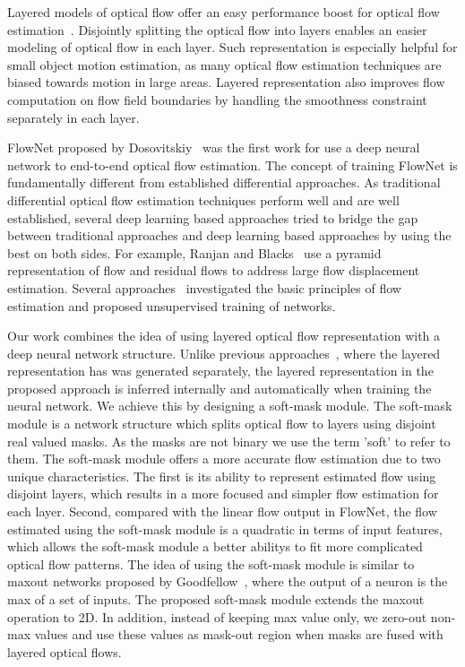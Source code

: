 \documentclass[10pt,twocolumn,letterpaper]{article}
\begin{document}
Layered models of optical flow offer an easy performance boost for optical flow estimation~\cite{wang1994representing}\cite{341161}\cite{darrell1995cooperative}. Disjointly splitting the optical flow into layers enables an easier modeling of optical flow in each layer. Such representation is especially helpful for small object motion estimation, as many optical flow estimation techniques are biased towards motion in large areas. Layered representation also improves flow computation on flow field boundaries by handling the smoothness constraint separately in each layer.

FlowNet proposed by Dosovitskiy~\cite{7410673} was the first work for use a deep neural network to end-to-end optical flow estimation. The concept of training FlowNet is fundamentally different from established differential approaches. As traditional differential optical flow estimation techniques perform well and are well established, several deep learning based approaches tried to bridge the gap between traditional approaches and deep learning based approaches by using the best on both sides. For example, Ranjan and Blacks~\cite{Ranjan_2017_CVPR} use a pyramid representation of flow and residual flows to address large flow displacement estimation. Several approaches~\cite{ren2017unsupervised}\cite{ahmadi2016unsupervised}\cite{DBLP:journals/corr/YuHD16} investigated the basic principles of flow estimation and proposed unsupervised training of networks.   

Our work combines the idea of using layered optical flow representation with a deep neural network structure. Unlike previous approaches~\cite{yang2015dense}\cite{black1996estimating}\cite{ju1996skin}, where the layered representation has was generated separately, the layered representation in the proposed approach is inferred internally and automatically when training the neural network. We achieve this by designing a soft-mask module. The soft-mask module is a network structure which splits optical flow to layers using disjoint real valued masks. As the masks are not binary we use the term 'soft' to refer to them. The soft-mask module offers a more accurate flow estimation due to two unique characteristics. The first is its ability to represent estimated flow using disjoint layers, which results in a more focused and simpler flow estimation for each layer. Second, compared with the linear flow output in FlowNet, the flow estimated using the soft-mask module is a quadratic in terms of input features, which allows the soft-mask module a better abilitys to fit more complicated optical flow patterns. The idea of using the soft-mask module is similar to maxout networks proposed by Goodfellow~\cite{Goodfellow:2013:MN:3042817.3043084}, where the output of a neuron is the max of a set of inputs. The proposed soft-mask module extends the maxout operation to 2D.  In addition, instead of keeping max value only, we zero-out non-max values and use these values as mask-out region when masks are fused with layered optical flows.
\end{document}

